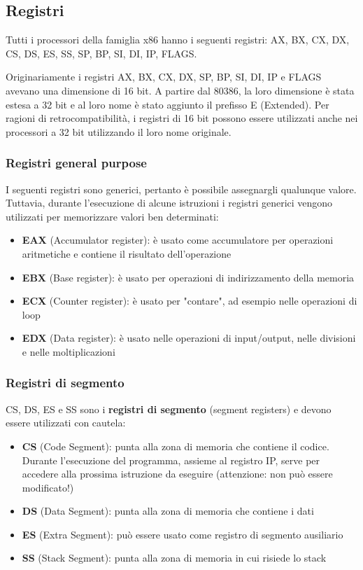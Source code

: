 \documentclass[a4paper]{article}
\theoremstyle{break}
\theoremstyle{break}
\theoremstyle{break}
\theoremstyle{break}
\begin{document}
\subsection{Registri}
Tutti i processori della famiglia x86 hanno i seguenti registri:
AX, BX, CX, DX, CS, DS, ES, SS, SP, BP, SI, DI, IP, FLAGS.

\vspace{1em}
\noindent Originariamente i registri AX, BX, CX, DX, SP, BP, SI, DI, IP e FLAGS avevano una dimensione
di 16 bit. A partire dal 80386, la loro dimensione è stata estesa a 32 bit e al loro nome
è stato aggiunto il prefisso E (Extended). Per ragioni di retrocompatibilità, i registri
di 16 bit possono essere utilizzati anche nei processori a 32 bit utilizzando il loro
nome originale.

\subsubsection{Registri general purpose}
I seguenti registri sono generici, pertanto è possibile assegnargli qualunque valore. Tuttavia,
durante l'esecuzione di alcune istruzioni i registri generici vengono utilizzati per
memorizzare valori ben determinati:
\begin{itemize}
	\item \textbf{EAX} (Accumulator register): è usato come accumulatore per
	      operazioni aritmetiche e contiene il risultato dell'operazione
	\item \textbf{EBX} (Base register): è usato per operazioni di indirizzamento della
	      memoria
	\item \textbf{ECX} (Counter register):  è usato per "contare", ad esempio nelle
	      operazioni di loop
	\item \textbf{EDX} (Data register): è usato nelle operazioni di input/output, nelle
	      divisioni e nelle moltiplicazioni

\end{itemize}

\subsubsection{Registri di segmento}
CS, DS, ES e SS sono i \textbf{registri di segmento} (segment registers) e devono
essere utilizzati con cautela:
\begin{itemize}
	\item \textbf{CS} (Code Segment): punta alla zona di memoria che contiene il codice.
	      Durante l'esecuzione del programma, assieme al registro IP, serve per
	      accedere alla prossima istruzione da eseguire (attenzione: non può
	      essere modificato!)
	\item \textbf{DS} (Data Segment): punta alla zona di memoria che contiene i dati
	\item \textbf{ES} (Extra Segment):  può essere usato come registro di segmento
	      ausiliario
	\item \textbf{SS} (Stack Segment): punta alla zona di memoria in cui risiede lo stack
\end{itemize}
\end{document}
